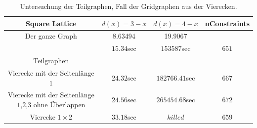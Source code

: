 \documentclass[
	fontsize=12pt,
	paper=a4,
	twoside=false,
	numbers=noenddot,
	plainheadsepline,
	toc=listof,
	toc=bibliography
]{scrartcl}
\begin{document}
	
\begin{table}[htbp]
\centering
\begin{tabular}{|c|c|c|c|}
	\hline
	 
	 Square Lattice       & $d(x)=3-x$  & $d(x)=4-x$   & nConstraints  \\ \hline 
	 Der ganze Graph	   & 8.63494	 & 19.9067      &               \\ 
			              & $15.34$sec	 & $153587$sec  & $651$\\ \hline
			              
	Teilgraphen & & &\\ \hline
	Vierecke mit der Seitenlänge $1$                         & $24.32$sec	& $182766.41$sec & $667$\\ \hline
	Vierecke mit der Seitenlänge $1$,$2$,$3$ ohne Überlappen & $24.56$sec   & $265454.68$sec & $672$\\ \hline
	Vierecke $1\times 2$                                     & $33.18$sec   & $killed$       & $659$\\ \hline

\end{tabular}
\caption{Untersuchung der Teilgraphen, Fall der Gridgraphen aus der Vierecken.} 
\label{Table:TG3}
\end{table}
\end{document}
